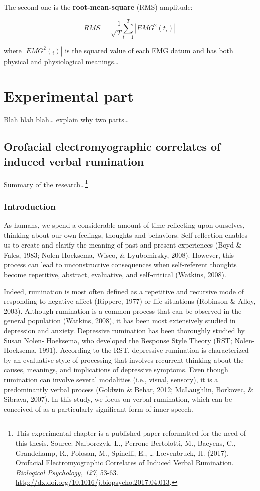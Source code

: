 \documentclass[12pt,]{book}
\let\rmarkdownfootnote\footnote%
\def\footnote{\protect\rmarkdownfootnote}
\begin{document}
The second one is the \textbf{root-mean-square} (RMS) amplitude:

\[RMS = \sqrt \frac{1}{T} \sum_{t=1}^{T} | EMG^{2}(t_{i}) |\]

where \(|EMG^{2}(_{i})|\) is the squared value of each EMG datum and has
both physical and physiological meanings\ldots{}

\part{Experimental part}\label{part-experimental-part}

Blah blah blah\ldots{} explain why two parts\ldots{}

\chapter{Orofacial electromyographic correlates of induced verbal
rumination}\label{orofacial-electromyographic-correlates-of-induced-verbal-rumination}

Summary of the research\ldots{}\footnote{This experimental chapter is a
  published paper reformatted for the need of this thesis. Source:
  Nalborczyk, L., Perrone-Bertolotti, M., Baeyens, C., Grandchamp, R.,
  Polosan, M., Spinelli, E., \ldots{} L\oe venbruck, H. (2017).
  Orofacial Electromyographic Correlates of Induced Verbal Rumination.
  \emph{Biological Psychology, 127}, 53-63.
  \url{http://dx.doi.org/10.1016/j.biopsycho.2017.04.013}.}

\section{Introduction}\label{introduction}

As humans, we spend a considerable amount of time reflecting upon
ourselves, thinking about our own feelings, thoughts and behaviors.
Self-reflection enables us to create and clarify the meaning of past and
present experiences (Boyd \& Fales, 1983; Nolen-Hoeksema, Wisco, \&
Lyubomirsky, 2008). However, this process can lead to unconstructive
consequences when self-referent thoughts become repetitive, abstract,
evaluative, and self-critical (Watkins, 2008).

Indeed, rumination is most often defined as a repetitive and recursive
mode of responding to negative affect (Rippere, 1977) or life situations
(Robinson \& Alloy, 2003). Although rumination is a common process that
can be observed in the general population (Watkins, 2008), it has been
most extensively studied in depression and anxiety. Depressive
rumination has been thoroughly studied by Susan Nolen- Hoeksema, who
developed the Response Style Theory (RST; Nolen-Hoeksema, 1991).
According to the RST, depressive rumination is characterized by an
evaluative style of processing that involves recurrent thinking about
the causes, meanings, and implications of depressive symptoms. Even
though rumination can involve several modalities (i.e., visual,
sensory), it is a predominantly verbal process (Goldwin \& Behar, 2012;
McLaughlin, Borkovec, \& Sibrava, 2007). In this study, we focus on
verbal rumination, which can be conceived of as a particularly
significant form of inner speech.
\end{document}
